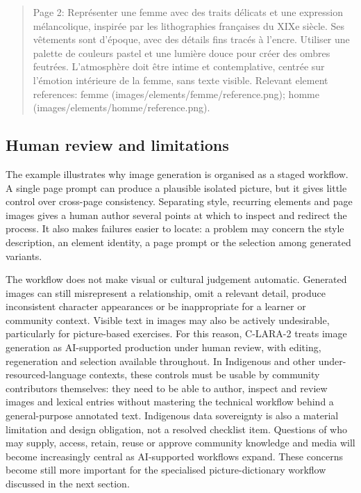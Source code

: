 \begin{quote}\small\ttfamily
Page 2: Représenter une femme avec des traits délicats et une expression
mélancolique, inspirée par les lithographies françaises du XIXe siècle. Ses
vêtements sont d'époque, avec des détails fins tracés à l'encre. Utiliser une
palette de couleurs pastel et une lumière douce pour créer des ombres feutrées.
L'atmosphère doit être intime et contemplative, centrée sur l'émotion
intérieure de la femme, sans texte visible. Relevant element references:
femme (images/elements/femme/reference.png); homme
(images/elements/homme/reference.png).
\end{quote}

\subsection{Human review and limitations}

The example illustrates why image generation is organised as a staged
workflow. A single page prompt can produce a plausible isolated picture, but
it gives little control over cross-page consistency. Separating style,
recurring elements and page images gives a human author several points at
which to inspect and redirect the process. It also makes failures easier to
locate: a problem may concern the style description, an element identity, a
page prompt or the selection among generated variants.

The workflow does not make visual or cultural judgement automatic. Generated
images can still misrepresent a relationship, omit a relevant detail, produce
inconsistent character appearances or be inappropriate for a learner or
community context. Visible text in images may also be actively undesirable,
particularly for picture-based exercises. For this reason, C-LARA-2 treats
image generation as AI-supported production under human review, with editing,
regeneration and selection available throughout. In Indigenous and other
under-resourced-language contexts, these controls must be usable by community
contributors themselves: they need to be able to author, inspect and review
images and lexical entries without mastering the technical workflow behind a
general-purpose annotated text. Indigenous data sovereignty is also a material
limitation and design obligation, not a resolved checklist item. Questions of
who may supply, access, retain, reuse or approve community knowledge and media
will become increasingly central as AI-supported workflows expand. These
concerns become still more important for the specialised picture-dictionary
workflow discussed in the next section.
